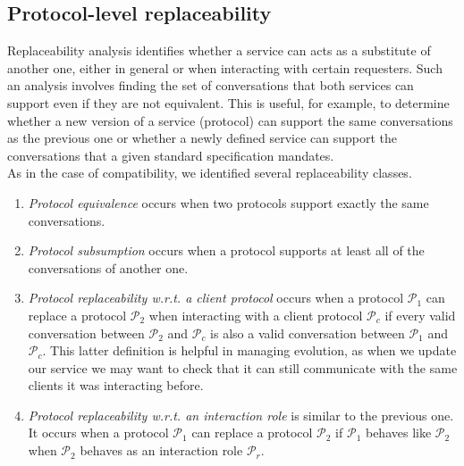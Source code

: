 
\subsection{Protocol-level replaceability}


Replaceability analysis identifies whether a service can acts as a substitute of another one, either in general or when interacting with certain requesters. Such an analysis involves finding the set of conversations that both services can support even if they are not equivalent. This is useful, for example, to determine whether a new version of a service (protocol) can support the same conversations as the previous one or whether a newly defined service can support the conversations that a given standard specification mandates.\\

As in the case of compatibility, we identified several replaceability classes.
\begin{enumerate}

	\item \emph{Protocol equivalence} occurs when two protocols support exactly the same conversations.
	
	\item \emph{Protocol subsumption} occurs when a protocol supports at least all of the conversations of another one.
	
	\item \emph{Protocol replaceability w.r.t. a client protocol} occurs when a protocol $\mathcal{P}_1$ can replace a protocol $\mathcal{P}_2$ when interacting with a client protocol $\mathcal{P}_c$ if every valid conversation between $\mathcal{P}_2$ and $\mathcal{P}_c$ is also a valid conversation between $\mathcal{P}_1$ and $\mathcal{P}_c$. This latter definition is helpful in managing evolution, as when we update our service we may want to check that it can still communicate with the same clients it was interacting before.
	
	\item \emph{Protocol replaceability w.r.t. an interaction role} is similar to the previous one. It occurs when a protocol $\mathcal{P}_1$ can replace a protocol $\mathcal{P}_2$ if $\mathcal{P}_1$ behaves like $\mathcal{P}_2$ when $\mathcal{P}_2$ behaves as an interaction role $\mathcal{P}_r$.

\end{enumerate}

